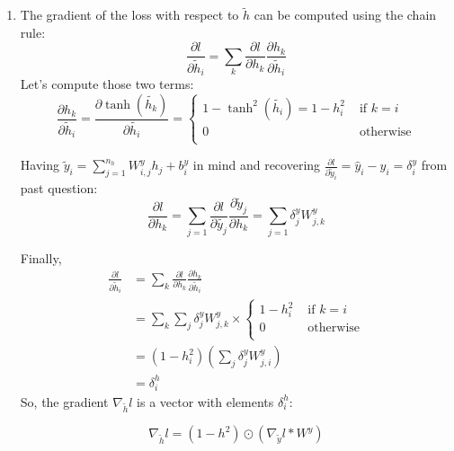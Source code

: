 \documentclass{article}
\theoremstyle{plain}%
\theoremstyle{definition}
\theoremstyle{remark}
\begin{document}
\begin{enumerate}
    \item The gradient of the loss with respect to \( \tilde{h} \) can be computed using the chain rule:
          \[
              \frac{\partial l}{\partial \tilde{h}_i} = \sum_{k}^{} \frac{\partial l}{\partial h_k} \frac{\partial h_k}{\partial \tilde{h}_i}
          \]
          Let's compute those two terms:
          \[
              \frac{\partial h_k}{\partial \tilde{h}_i} = \frac{\partial \tanh (\tilde{h_k})}{\partial \tilde{h_i}} = \begin{cases}
                  1 - \tanh^2 (\tilde{h_i}) = 1 - h_i^2 & \text{ if } k = i \\
                  0                                     & \text{ otherwise} \\
              \end{cases}
          \]

          Having $ \tilde{y}_i = \sum_{j=1}^{n_h} W_{i,j}^y h_j +b_i^y$ in mind and recovering $ \frac{\partial l}{\partial \tilde{y}_i} = \hat{y}_i - y_i = \delta ^y_i $ from past question:
          \[
              \frac{\partial l}{\partial h_k} = \sum_{j=1}^{} \frac{\partial l}{\partial \tilde{y_j}} \frac{\partial \tilde{y}_j}{\partial h_k} = \sum_{j=1}^{} \delta ^y_j W^y_{j,k}
          \]

          Finally,
          \begin{align*}
              \frac{\partial l}{\partial \tilde{h}_i} & = \sum_{k}^{} \frac{\partial l}{\partial h_k} \frac{\partial h_k}{\partial \tilde{h}_i} \\
                                                      & = \sum_{k}^{} \sum_{j}^{} \delta ^y_j W^y_{j,k} \times \begin{cases}
                  1 - h_i^2 & \text{ if } k = i \\
                  0         & \text{ otherwise} \\
              \end{cases}       \\
                                                      & = (1 - h_i^2) \left(\sum_{j}^{} \delta ^y_j W^y_{j,i}\right)                            \\
                                                      & = \delta ^h _i
          \end{align*}
          So, the gradient \( \nabla _{\tilde{h}} l \) is a vector with elements $ \delta ^h _i $:

          \[
              \nabla _{\tilde{h}} l = (1 - h^2) \odot (\nabla _{\tilde{y}} l * W^y)
          \]



\end{enumerate}
\end{document}
